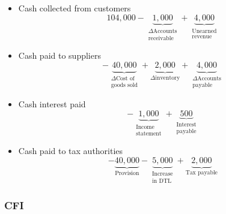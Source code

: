 \documentclass[../notes_compiled.tex]{subfiles}
\begin{document}
\begin{enumerate}
{\begin{itemize}
\item[] Cash collected from customers
\begin{equation*}
104,000 - \underbrace{1,000}_{\substack{\Delta \text{Accounts} \\ \text{receivable}}} + \underbrace{4,000}_{\substack{\text{Unearned} \\ \text{revenue}}}
\end{equation*}

\item[] Cash paid to suppliers
\begin{equation*}
- \underbrace{40,000}_{\substack{\Delta \text{Cost of} \\ \text{goods sold}}} + \underbrace{2,000}_{\Delta \text{inventory}} + \underbrace{4,000}_{\substack{\Delta \text{Accounts} \\ \text{payable}}}
\end{equation*}

\item[] Cash interest paid
\begin{equation*}
- \underbrace{1,000}_{\substack{\text{Income} \\ \text{statement}}} + \underbrace{500}_{\substack{\text{Interest} \\ \text{payable}}}
\end{equation*}

\item[] Cash paid to tax authorities
\begin{equation*}
- \underbrace{40,000}_{\text{Provision}} - \underbrace{5,000}_{\substack{\text{Increase} \\ \text{in DTL}}} + \underbrace{2,000}_{\text{Tax payable}}
\end{equation*}

\end{itemize}

}
\end{enumerate}



\subsubsection{CFI}
\end{document}
